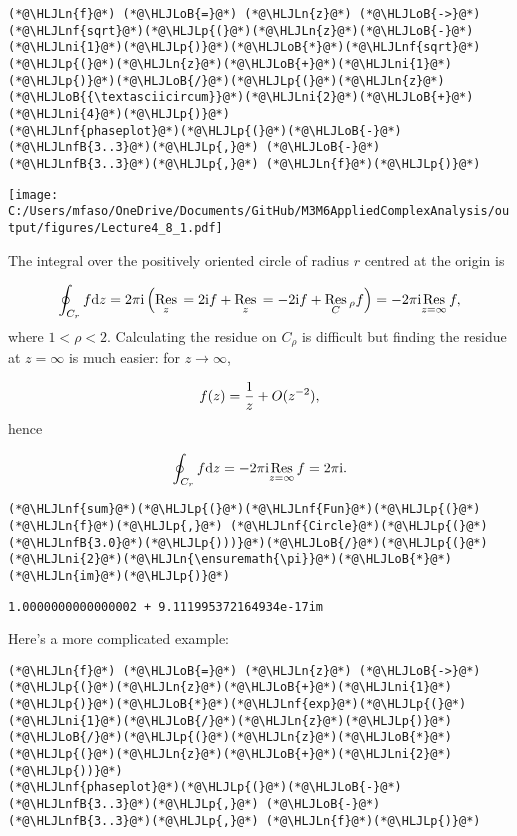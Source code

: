 \documentclass[12pt,a4paper]{article}
\newcommand{\HLJLn}[1]{#1}
\newcommand{\HLJLnf}[1]{\textcolor[RGB]{66,102,213}{#1}}
\newcommand{\HLJLnfB}[1]{\textcolor[RGB]{59,151,46}{#1}}
\newcommand{\HLJLni}[1]{\textcolor[RGB]{59,151,46}{#1}}
\newcommand{\HLJLoB}[1]{\textcolor[RGB]{102,102,102}{\textbf{#1}}}
\newcommand{\HLJLp}[1]{#1}
\def\D{ {\rm d} }
\def\I{ {\rm i} }
\def\Res_#1{\underset{#1}{\rm Res}\,}
\def\pr(#1){\left({#1}\right)}
\begin{document}
\begin{lstlisting}
(*@\HLJLn{f}@*) (*@\HLJLoB{=}@*) (*@\HLJLn{z}@*) (*@\HLJLoB{->}@*) (*@\HLJLnf{sqrt}@*)(*@\HLJLp{(}@*)(*@\HLJLn{z}@*)(*@\HLJLoB{-}@*)(*@\HLJLni{1}@*)(*@\HLJLp{)}@*)(*@\HLJLoB{*}@*)(*@\HLJLnf{sqrt}@*)(*@\HLJLp{(}@*)(*@\HLJLn{z}@*)(*@\HLJLoB{+}@*)(*@\HLJLni{1}@*)(*@\HLJLp{)}@*)(*@\HLJLoB{/}@*)(*@\HLJLp{(}@*)(*@\HLJLn{z}@*)(*@\HLJLoB{{\textasciicircum}}@*)(*@\HLJLni{2}@*)(*@\HLJLoB{+}@*)(*@\HLJLni{4}@*)(*@\HLJLp{)}@*)
(*@\HLJLnf{phaseplot}@*)(*@\HLJLp{(}@*)(*@\HLJLoB{-}@*)(*@\HLJLnfB{3..3}@*)(*@\HLJLp{,}@*) (*@\HLJLoB{-}@*)(*@\HLJLnfB{3..3}@*)(*@\HLJLp{,}@*) (*@\HLJLn{f}@*)(*@\HLJLp{)}@*)
\end{lstlisting}

\texttt{[image: C:/Users/mfaso/OneDrive/Documents/GitHub/M3M6AppliedComplexAnalysis/output/figures/Lecture4\_8\_1.pdf]}

The integral over the positively oriented circle of radius $r$ centred at the origin is

\[
\oint_{C_r} f \D z = 2 \pi \I \pr(\Res_{z = 2\I} f +  \Res_{z = -2\I} f +  \Res_{C_{\rho}} f) = -2 \pi \I \Res_{z = \infty} f,
\]
where $1 < \rho < 2$. Calculating the residue on $C_{\rho}$ is difficult but finding the residue at $z = \infty$ is much easier: for $z \rightarrow \infty$,

\[
f(z) = {1 \over z} + O(z^{-2}),
\]
hence

\[
\oint_{C_r} f \D z = -2 \pi \I \Res_{z = \infty} f = 2\pi \I.
\]

\begin{lstlisting}
(*@\HLJLnf{sum}@*)(*@\HLJLp{(}@*)(*@\HLJLnf{Fun}@*)(*@\HLJLp{(}@*)(*@\HLJLn{f}@*)(*@\HLJLp{,}@*) (*@\HLJLnf{Circle}@*)(*@\HLJLp{(}@*)(*@\HLJLnfB{3.0}@*)(*@\HLJLp{)))}@*)(*@\HLJLoB{/}@*)(*@\HLJLp{(}@*)(*@\HLJLni{2}@*)(*@\HLJLn{\ensuremath{\pi}}@*)(*@\HLJLoB{*}@*)(*@\HLJLn{im}@*)(*@\HLJLp{)}@*)
\end{lstlisting}

\begin{lstlisting}
1.0000000000000002 + 9.111995372164934e-17im
\end{lstlisting}


Here's a more complicated example:


\begin{lstlisting}
(*@\HLJLn{f}@*) (*@\HLJLoB{=}@*) (*@\HLJLn{z}@*) (*@\HLJLoB{->}@*) (*@\HLJLp{(}@*)(*@\HLJLn{z}@*)(*@\HLJLoB{+}@*)(*@\HLJLni{1}@*)(*@\HLJLp{)}@*)(*@\HLJLoB{*}@*)(*@\HLJLnf{exp}@*)(*@\HLJLp{(}@*)(*@\HLJLni{1}@*)(*@\HLJLoB{/}@*)(*@\HLJLn{z}@*)(*@\HLJLp{)}@*)(*@\HLJLoB{/}@*)(*@\HLJLp{(}@*)(*@\HLJLn{z}@*)(*@\HLJLoB{*}@*)(*@\HLJLp{(}@*)(*@\HLJLn{z}@*)(*@\HLJLoB{+}@*)(*@\HLJLni{2}@*)(*@\HLJLp{))}@*)
(*@\HLJLnf{phaseplot}@*)(*@\HLJLp{(}@*)(*@\HLJLoB{-}@*)(*@\HLJLnfB{3..3}@*)(*@\HLJLp{,}@*) (*@\HLJLoB{-}@*)(*@\HLJLnfB{3..3}@*)(*@\HLJLp{,}@*) (*@\HLJLn{f}@*)(*@\HLJLp{)}@*)
\end{lstlisting}
\end{document}

